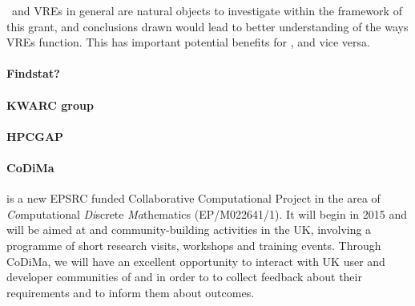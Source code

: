 \TheProject\ and VREs in general are natural objects to investigate 
within the framework of this grant, and conclusions drawn would lead to better understanding
of the ways VREs function. This has important potential benefits for \TheProject, and
vice versa. 



\paragraph{Findstat?}

\paragraph{KWARC group}

\paragraph{HPCGAP}

\paragraph{CoDiMa} is a new EPSRC funded Collaborative Computational Project 
in the area of {\em Co}mputational {\em Di}screte {\em Ma}thematics (EP/M022641/1).
It will begin in 2015 and will be aimed at \GAP and \Sage community-building 
activities in the UK, involving a programme of short research visits, workshops 
and training events. Through CoDiMa, we will have an excellent opportunity to
interact with UK user and developer communities of \GAP and \Sage in order to
to collect feedback about their requirements and to inform them about \TheProject 
outcomes.






